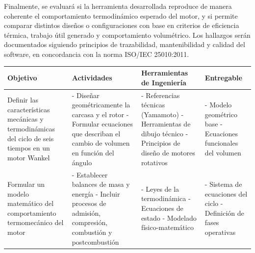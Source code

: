 \documentclass{LS}
\begin{document}
Finalmente, se evaluará si la herramienta desarrollada reproduce de manera coherente el comportamiento termodinámico esperado del motor, y si permite comparar distintos diseños o configuraciones con base en criterios de eficiencia térmica, trabajo útil generado y comportamiento volumétrico. Los hallazgos serán documentados siguiendo principios de trazabilidad, mantenibilidad y calidad del software, en concordancia con la norma ISO/IEC 25010:2011.



\begin{table}[H]
    \centering
    \tiny %
    \renewcommand{\arraystretch}{0.8} %

    \begin{tabular}{p{2.6cm} p{3.5cm} p{3.5cm} p{3cm}}
        \hline
        \textbf{Objetivo} & \textbf{Actividades} & \textbf{Herramientas de Ingeniería} & \textbf{Entregable} \\
        \hline

        Definir las características mecánicas y termodinámicas del ciclo de seis tiempos en un motor Wankel &
        - Diseñar geométricamente la carcasa y el rotor \newline
        - Formular ecuaciones que describan el cambio de volumen en función del ángulo &
        - Referencias técnicas (Yamamoto) \newline
        - Herramientas de dibujo técnico \newline
        - Principios de diseño de motores rotativos &
        - Modelo geométrico base \newline
        - Ecuaciones funcionales del volumen \\

        \hline

        Formular un modelo matemático del comportamiento termomecánico del motor &
        - Establecer balances de masa y energía \newline
        - Incluir procesos de admisión, compresión, combustión y postcombustión &
        - Leyes de la termodinámica \newline
        - Ecuaciones de estado \newline
        - Modelado físico-matemático &
        - Sistema de ecuaciones del ciclo \newline
        - Definición de fases operativas \\

        \hline


\end{tabular}
\end{table}
\end{document}
